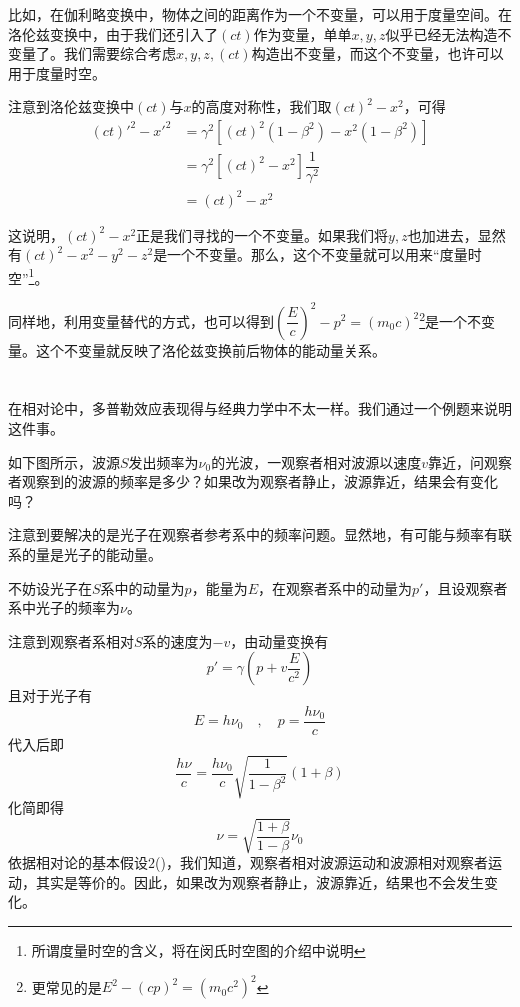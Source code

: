 比如，在伽利略变换中，物体之间的距离作为一个不变量，可以用于度量空间。在洛伦兹变换中，由于我们还引入了$(ct)$作为变量，单单$x,y,z$似乎已经无法构造不变量了。我们需要综合考虑$x,y,z,(ct)$构造出不变量，而这个不变量，也许可以用于度量时空。

注意到洛伦兹变换中$(ct)$与$x$的高度对称性，我们取$(ct)^2-x^2$，可得
\begin{equation}
	\begin{aligned}
		{(ct)'}^2-{x'}^2&=\gamma^2[(ct)^2(1-\beta^2)-x^2(1-\beta^2)]\\
		&=\gamma^2[(ct)^2-x^2]\dfrac{1}{\gamma^2}\\
		&=(ct)^2-x^2
	\end{aligned}
\end{equation}

这说明，$(ct)^2-x^2$正是我们寻找的一个不变量。如果我们将$y,z$也加进去，显然有$(ct)^2-x^2-y^2-z^2$是一个不变量。那么，这个不变量就可以用来``度量时空''\footnote{所谓度量时空的含义，将在闵氏时空图的介绍中说明}。

同样地，利用变量替代的方式，也可以得到$\left(\dfrac{E}{c}\right)^2-p^2=\left(m_0c\right)^2$\footnote{更常见的是${E}^2-(cp)^2=\left(m_0c^2\right)^2$}是一个不变量。这个不变量就反映了洛伦兹变换前后物体的能动量关系。
\section[多普勒效应]{}
在相对论中，多普勒效应表现得与经典力学中不太一样。我们通过一个例题来说明这件事。
\begin{ex}[光的多普勒效应]
    如下图所示，波源$S$发出频率为$\nu_0$的光波，一观察者相对波源以速度$v$靠近，问观察者观察到的波源的频率是多少？如果改为观察者静止，波源靠近，结果会有变化吗？
\end{ex}
\begin{so}[光的多普勒效应]
	注意到要解决的是光子在观察者参考系中的频率问题。显然地，有可能与频率有联系的量是光子的能动量。
	
	不妨设光子在$S$系中的动量为$p$，能量为$E$，在观察者系中的动量为$p'$，且设观察者系中光子的频率为$\nu$。
	
	注意到观察者系相对$S$系的速度为$-v$，由动量变换有
    \[p'=\gamma\left(p+v\frac{E}{c^2}\right)\]
    且对于光子有
    \[E=h\nu_0\quad,\quad p=\dfrac{h\nu_0}{c}\]
    代入后即
    \[\frac{h\nu}{c}=\frac{h\nu_0}{c}\sqrt{\frac{1}{1-\beta^2}}(1+\beta)\]
    化简即得
    \[\nu=\sqrt{\frac{1+\beta}{1-\beta}}\nu_0\]
    依据相对论的基本假设$2$()，我们知道，观察者相对波源运动和波源相对观察者运动，其实是等价的。因此，如果改为观察者静止，波源靠近，结果也不会发生变化。
\end{so}
